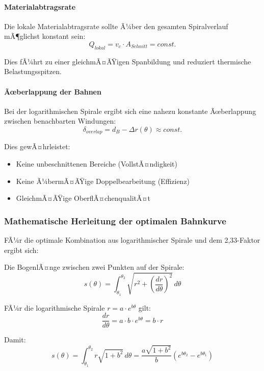 ﻿\documentclass[12pt,a4paper]{article}
\begin{document}
\paragraph{Materialabtragsrate} Die lokale Materialabtragsrate sollte Ã¼ber den gesamten Spiralverlauf mÃ¶glichst konstant sein:
\begin{equation}
	Q_{lokal} = v_c \cdot A_{Schnitt} = const.
\end{equation}

Dies fÃ¼hrt zu einer gleichmÃ¤ÃŸigen Spanbildung und reduziert thermische Belastungsspitzen.

\paragraph{Ãœberlappung der Bahnen} Bei der logarithmischen Spirale ergibt sich eine nahezu konstante Ãœberlappung zwischen benachbarten Windungen:
\begin{equation}
	\delta_{overlap} = d_B - \Delta r(\theta) \approx const.
\end{equation}

Dies gewÃ¤hrleistet:
\begin{itemize}
	\item Keine unbeschnittenen Bereiche (VollstÃ¤ndigkeit)
	\item Keine Ã¼bermÃ¤ÃŸige Doppelbearbeitung (Effizienz)
	\item GleichmÃ¤ÃŸige OberflÃ¤chenqualitÃ¤t
\end{itemize}

\subsubsection{Mathematische Herleitung der optimalen Bahnkurve}

FÃ¼r die optimale Kombination aus logarithmischer Spirale und dem 2,33-Faktor ergibt sich:

Die BogenlÃ¤nge zwischen zwei Punkten auf der Spirale:
\begin{equation}
	s(\theta) = \int_{\theta_1}^{\theta_2} \sqrt{r^2 + \left(\frac{dr}{d\theta}\right)^2} \, d\theta
\end{equation}

FÃ¼r die logarithmische Spirale $r = a \cdot e^{b\theta}$ gilt:
\begin{equation}
	\frac{dr}{d\theta} = a \cdot b \cdot e^{b\theta} = b \cdot r
\end{equation}

Damit:
\begin{equation}
	s(\theta) = \int_{\theta_1}^{\theta_2} r\sqrt{1 + b^2} \, d\theta = \frac{a\sqrt{1+b^2}}{b}\left(e^{b\theta_2} - e^{b\theta_1}\right)
\end{equation}
\end{document}
